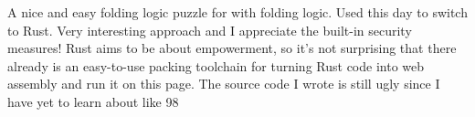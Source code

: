 A nice and easy folding logic puzzle for with folding logic. Used this day to switch to Rust. Very interesting approach and I appreciate the built-in security measures! Rust aims to be about empowerment, so it's not surprising that there already is an easy-to-use packing toolchain for turning Rust code into web assembly and run it on this page. The source code I wrote is still ugly since I have yet to learn about like 98%